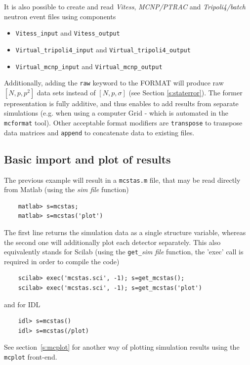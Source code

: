 It is also possible to create and read \textit{Vitess}, \textit{MCNP/PTRAC} and
\textit{Tripoli4/batch} neutron event files using components
\begin{itemize}
\item \verb+Vitess_input+ and \verb+Vitess_output+
\item \verb+Virtual_tripoli4_input+ and \verb+Virtual_tripoli4_output+
\item \verb+Virtual_mcnp_input+ and \verb+Virtual_mcnp_output+
\end{itemize}  

Additionally, adding the \texttt{raw} keyword to the FORMAT will produce raw
$[N, p, p^2]$ data sets instead of $[N, p, \sigma]$ (see Section
\ref{s:staterror}). The former representation is fully additive, and thus
enables to add results from separate simulations (e.g. when using a computer
Grid - which is automated in the \verb+mcformat+ tool). Other acceptable format
modifiers are \verb+transpose+ to transpose data matrices and \verb+append+ to
concatenate data to existing files.

\subsection{Basic import and plot of results}
\label{s:run-format}
The previous example will result in a \verb+mcstas.m+ file, that may be read
directly from Matlab (using the {\it sim file} function)
\begin{verbatim}
    matlab> s=mcstas;
    matlab> s=mcstas('plot')
\end{verbatim} 
The first line returns the simulation data as a single structure variable,
whereas the second one will additionally plot each detector separately.  This
also equivalently stands for Scilab (using the \verb+get_+{\it sim file}
function, the 'exec' call is required in order to compile the code)
\begin{verbatim}
    scilab> exec('mcstas.sci', -1); s=get_mcstas();
    scilab> exec('mcstas.sci', -1); s=get_mcstas('plot')
\end{verbatim} 
and for IDL
\begin{verbatim}
    idl> s=mcstas()
    idl> s=mcstas(/plot)
\end{verbatim} 
See section~\ref{s:mcplot} for another way of plotting simulation results
using the \verb+mcplot+ front-end. 

